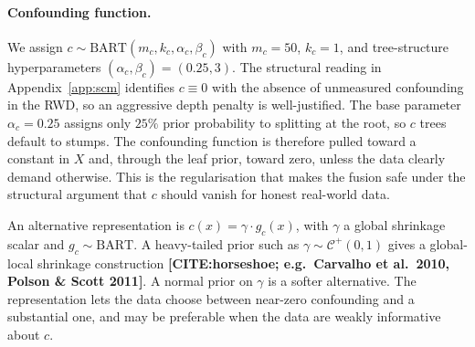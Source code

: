 \paragraph{Confounding function.}
We assign $c \sim \mathrm{BART}(m_c, k_c, \alpha_c, \beta_c)$ with $m_c = 50$, $k_c = 1$, and tree-structure hyperparameters $(\alpha_c, \beta_c) = (0.25, 3)$.
The structural reading in Appendix~\ref{app:scm} identifies $c \equiv 0$ with the absence of unmeasured confounding in the RWD, so an aggressive depth penalty is well-justified.
The base parameter $\alpha_c = 0.25$ assigns only $25\%$ prior probability to splitting at the root, so $c$ trees default to stumps.
The confounding function is therefore pulled toward a constant in $X$ and, through the leaf prior, toward zero, unless the data clearly demand otherwise.
This is the regularisation that makes the fusion safe under the structural argument that $c$ should vanish for honest real-world data.

\begin{remark}
An alternative representation is $c(x) = \gamma \cdot g_c(x)$, with $\gamma$ a global shrinkage scalar and $g_c \sim \mathrm{BART}$.
A heavy-tailed prior such as $\gamma \sim \mathcal{C}^+(0, 1)$ gives a global-local shrinkage construction \textbf{[CITE:horseshoe; e.g.\ Carvalho et al.\ 2010, Polson \& Scott 2011]}.
A normal prior on $\gamma$ is a softer alternative.
The representation lets the data choose between near-zero confounding and a substantial one, and may be preferable when the data are weakly informative about $c$.
\end{remark}


